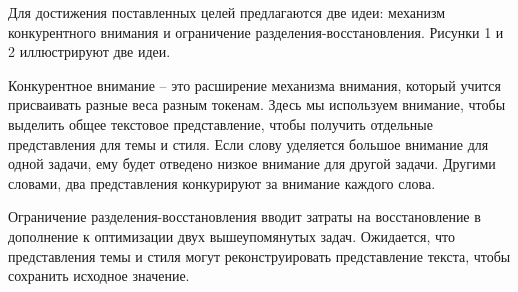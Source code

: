 \par Для достижения поставленных целей 
предлагаются две идеи: механизм конкурентного внимания и ограничение разделения-восстановления. Рисунки 1 и 2 иллюстрируют две идеи. 
\par Конкурентное внимание – это расширение механизма внимания, который учится присваивать разные веса разным токенам. 
Здесь мы используем внимание, чтобы выделить общее текстовое представление, чтобы получить отдельные представления для темы и стиля. 
Если слову уделяется большое внимание для одной задачи, ему будет отведено низкое внимание для другой задачи. 
Другими словами, два представления конкурируют за внимание каждого слова.
\par Ограничение разделения-восстановления вводит затраты на восстановление в дополнение к оптимизации двух вышеупомянутых задач. Ожидается, что представления 
темы и стиля могут реконструировать представление текста, чтобы сохранить исходное значение.

